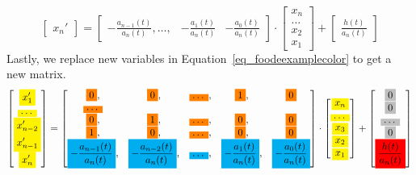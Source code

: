 \begin{equation}
  \begin{bmatrix}
		x_{n}'
	\end{bmatrix}
  = 
	\begin{bmatrix}
		-\frac{a_{n-1}(t)}{a_n(t)}, \dots, & -\frac{a_{1}(t)}{a_n(t)} & -\frac{a_{0}(t)}{a_n(t)}
	\end{bmatrix}
	\cdot
	\begin{bmatrix}
		x_{n} \\
		\dots \\
    x_{2} \\
		x_{1}  
	\end{bmatrix}
	+
	\begin{bmatrix}
		\frac{h(t)}{a_n(t)}
	\end{bmatrix}
  \nonumber
\end{equation}
Lastly, we replace new variables in Equation~\ref{eq_foodeexamplecolor} to get a new matrix.
\begin{equation}\label{eq_foodeexampledetail}
	\begin{bmatrix}
		\highlight{yellow}{x_{1}'} \\
    \highlight{yellow}{\dots} \\
    \highlight{yellow}{x_{n-2}'} \\
    \highlight{yellow}{x_{n-1}'} \\
    \highlight{yellow}{x_{n}'}
	\end{bmatrix}
    = 
  \begin{bmatrix}
		\highlight{orange}{0}, & \highlight{orange}{0}, & \highlight{orange}{\dots}, & \highlight{orange}{1}, & \highlight{orange}{0} \\
    \highlight{orange}{\dots} \\
    \highlight{orange}{0}, & \highlight{orange}{1}, & \highlight{orange}{\dots}, & \highlight{orange}{0}, & \highlight{orange}{0} \\
    \highlight{orange}{1}, & \highlight{orange}{0}, & \highlight{orange}{\dots}, & \highlight{orange}{0}, & \highlight{orange}{0} \\
    \highlight{cyan}{-\frac{a_{n-1}(t)}{a_n(t)}}, & \highlight{cyan}{-\frac{a_{n-2}(t)}{a_n(t)}}, & \highlight{cyan}{\dots}, & \highlight{cyan}{-\frac{a_{1}(t)}{a_n(t)}}, & \highlight{cyan}{-\frac{a_{0}(t)}{a_n(t)}}
	\end{bmatrix}
    \cdot
  \begin{bmatrix}
    \highlight{yellow}{x_{n}} \\
    \highlight{yellow}{\dots} \\
    \highlight{yellow}{x_{3}} \\
		\highlight{yellow}{x_{2}} \\
    \highlight{yellow}{x_{1}}
	\end{bmatrix}
    + 
  \begin{bmatrix}
    \highlight{lightgray}{0} \\
    \highlight{lightgray}{0} \\
    \highlight{lightgray}{\dots} \\
    \highlight{lightgray}{0} \\
    \highlight{red}{\frac{h(t)}{a_n(t)}}
	\end{bmatrix}
\end{equation}
